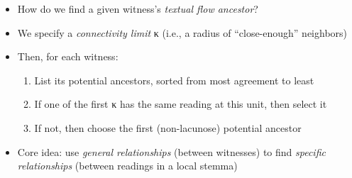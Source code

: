 \documentclass[10pt]{beamer}
\begin{document}
	\begin{frame}
		\begin{itemize}
			\item How do we find a given witness's \emph{textual flow ancestor}?
			\item We specify a \emph{connectivity limit} \textgreek{κ} (i.e., a radius of ``close-enough'' neighbors)
			\item Then, for each witness:
			\begin{enumerate}
				\item List its potential ancestors, sorted from most agreement to least
				\item If one of the first \textgreek{κ} has the same reading at this unit, then select it
				\item If not, then choose the first (non-lacunose) potential ancestor
			\end{enumerate}
			\item Core idea: use \emph{general relationships} (between witnesses) to find \emph{specific relationships} (between readings in a local stemma)
		\end{itemize}
	\end{frame}
\end{document}
